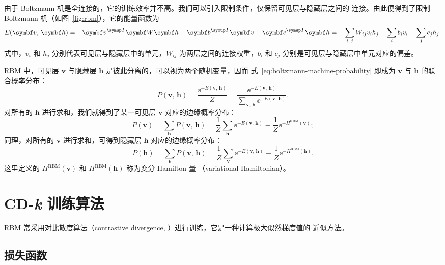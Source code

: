 由于 Boltzmann 机是全连接的，它的训练效率并不高。我们可以引入限制条件，仅保留可见层与隐藏层之间的
连接。由此便得到了限制 Boltzmann 机（如图~\ref{fig:rbm}），它的能量函数为
\begin{equation}
  \label{eq:rbm-energy}
  E(\bm{v},\,\bm{h})
  = - \bm{v}^\trans \bm{W} \bm{h} - \bm{b}^\trans \bm{v} - \bm{c}^\trans \bm{h}
  = - \sum_{i,\,j} W_{ij} v_i h_j - \sum_i b_i v_i - \sum_j c_j h_j.
\end{equation}
式中，$v_i$ 和 $h_j$ 分别代表可见层与隐藏层中的单元，$W_{ij}$ 为两层之间的连接权重，$b_i$ 和 $c_j$
分别是可见层与隐藏层中单元对应的偏差。

RBM 中，可见层 $\bm{v}$ 与隐藏层 $\bm{h}$ 是彼此分离的，可以视为两个随机变量，因而
式~\eqref{eq:boltzmann-machine-probability} 即成为 $\bm{v}$ 与 $\bm{h}$ 的联合概率分布：
\begin{equation}
  P(\bm{v},\,\bm{h})
  = \frac{\ee^{-E(\bm{v},\,\bm{h})}}{Z}
  = \frac{\ee^{-E(\bm{v},\,\bm{h})}}{\sum_{\bm{v},\,\bm{h}}\ee^{-E(\bm{v},\,\bm{h})}}.
\end{equation}
对所有的 $\bm{h}$ 进行求和，我们就得到了某一可见层 $\bm{v}$ 对应的边缘概率分布：
\begin{equation}
  \label{eq:rbm-probability-v}
  P(\bm{v}) = \sum_{\bm{h}} P(\bm{v},\,\bm{h})
            = \frac{1}{Z} \sum_{\bm{h}} \ee^{-E(\bm{v},\,\bm{h})}
            \equiv \frac{1}{Z} \ee^{-H^{\text{RBM}}(\bm{v})};
\end{equation}
同理，对所有的 $\bm{v}$ 进行求和，可得到隐藏层 $\bm{h}$ 对应的边缘概率分布：
\begin{equation}
  \label{eq:rbm-probability-h}
  P(\bm{h}) = \sum_{\bm{h}} P(\bm{v},\,\bm{h})
            = \frac{1}{Z} \sum_{\bm{v}} \ee^{-E(\bm{v},\,\bm{h})}
            \equiv \frac{1}{Z} \ee^{-H^{\text{RBM}}(\bm{h})}.
\end{equation}
这里定义的 $H^{\text{RBM}}(\bm{v})$ 和 $H^{\text{RBM}}(\bm{h})$ 称为变分 Hamilton 量
（variational Hamiltonian）。

\section{CD-\textit{k} 训练算法}
\label{sec:CDk-algorithm}

RBM 常采用对比散度算法（contrastive divergence, \CDk）进行训练，它是一种计算极大似然梯度值的
近似方法。

\subsection{损失函数}

